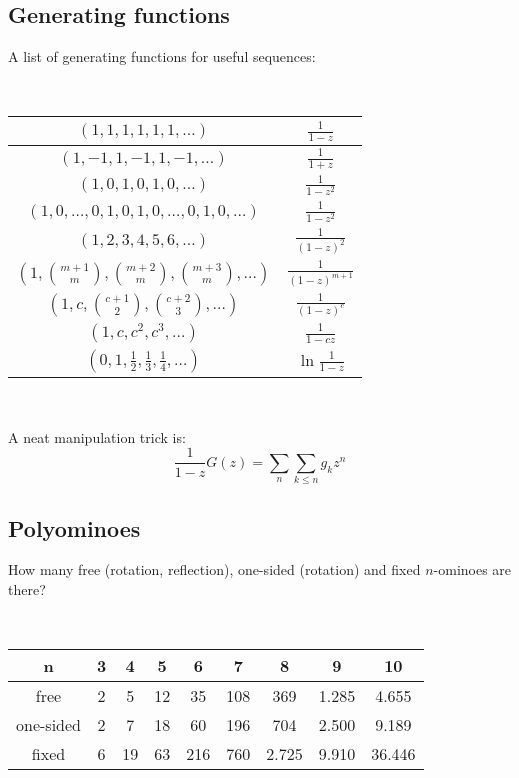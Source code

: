 \documentclass[a4paper]{amsart}
\begin{document}
\begin{multicols}{2}
    \subsection{Generating functions}
      A list of generating functions for useful sequences:

      \ 

      \begin{tabular}{|c|c|}
        \hline 
        $(1,1,1,1,1,1,\ldots)$ & $\frac{1}{1-z}$ \\ \hline
        $(1,-1,1,-1,1,-1,\ldots)$ & $\frac{1}{1+z}$ \\ \hline
        $(1,0,1,0,1,0,\ldots)$ & $\frac{1}{1-z^2}$ \\ \hline        
        $(1,0,\ldots,0,1,0,1,0,\ldots,0,1,0,\ldots)$ & $\frac{1}{1-z^2}$ \\ \hline
        $(1,2,3,4,5,6,\ldots)$ & $\frac{1}{(1-z)^2}$ \\ \hline
        $(1,\binom{m+1}{m},\binom{m+2}{m},\binom{m+3}{m},\ldots)$ & $\frac{1}{(1-z)^{m+1}}$ \\ \hline
        $(1,c,\binom{c+1}{2},\binom{c+2}{3},\ldots)$ & $\frac{1}{(1-z)^c}$ \\ \hline    
        $(1,c,c^2, c^3, \ldots)$ & $\frac{1}{1-cz}$ \\ \hline    
        $(0,1,\frac{1}{2},\frac{1}{3},\frac{1}{4},\ldots)$ & $\ln \frac{1}{1-z}$ \\ \hline    
      \end{tabular}      

      \ 

      A neat manipulation trick is:
      \begin{equation*}
        \frac{1}{1-z}G(z) = \sum_{n}\sum_{k\leq n}g_kz^n
      \end{equation*}

    \subsection{Polyominoes} How many free (rotation, reflection), one-sided (rotation) and fixed $n$-ominoes are there?

      \ 

      \begin{tabular}{|c|c|c|c|c|c|c|c|c|}
        \hline
        n&3&4&5&6&7&8&9&10 \\ \hline
        free&2&5&12&35&108&369&1.285&4.655 \\ \hline
        one-sided&2&7&18&60&196&704&2.500&9.189 \\ \hline
        fixed&6&19&63&216&760&2.725&9.910&36.446 \\ \hline
      \end{tabular}


\end{multicols}
\end{document}

